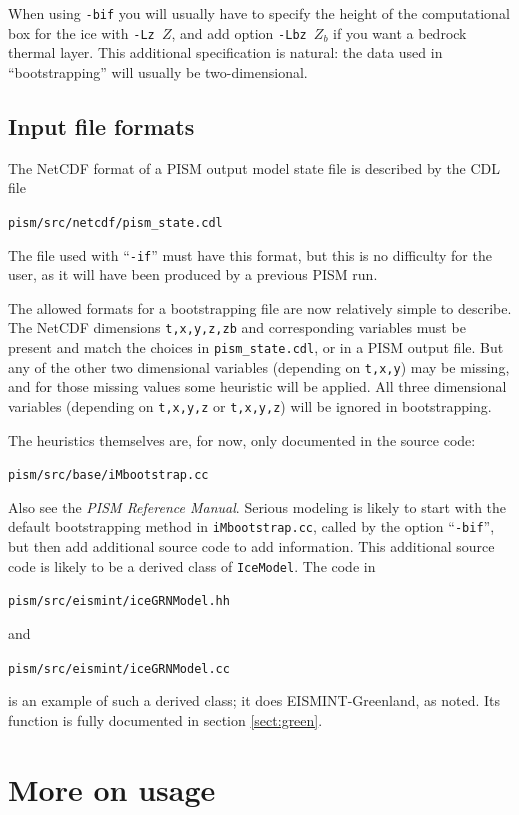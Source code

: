 \documentclass[11pt,final]{amsart}
\begin{document}
When using \verb|-bif| you will usually have to specify the height of the computational box for the ice with \verb|-Lz |$Z$, and add option \verb|-Lbz |$Z_b$ if you want a bedrock thermal layer.  This additional specification is natural: the data used in ``bootstrapping'' will usually be two-dimensional.

\subsection{Input file formats} The NetCDF format of a PISM output model state file is described by the CDL file
\begin{center}\verb|pism/src/netcdf/pism_state.cdl|\end{center}
\noindent The file used with ``\verb|-if|'' must have this format, but this is no difficulty for the user, as it will have been produced by a previous PISM run.

The allowed formats for a bootstrapping file are now relatively simple to describe.  The NetCDF dimensions \verb|t,x,y,z,zb| and corresponding variables must be present and match the choices in \verb|pism_state.cdl|, or in a PISM output file.  But any of the other two dimensional variables (depending on \verb|t,x,y|) may be missing, and for those missing values some heuristic will be applied.  All three dimensional variables (depending on \verb|t,x,y,z| or \verb|t,x,y,z|) will be ignored in bootstrapping.

The heuristics themselves are, for now, only documented in the source code:
\begin{center}\verb|pism/src/base/iMbootstrap.cc|\end{center}
\noindent Also see the \emph{PISM Reference Manual}.  Serious modeling is likely to start with the default bootstrapping method in \verb|iMbootstrap.cc|, called by the option ``\verb|-bif|'', but then add additional source code to add information.  This additional source code is likely to be a derived class of \verb|IceModel|.  The code in 
\begin{center}\verb|pism/src/eismint/iceGRNModel.hh|\end{center}
\noindent and
\begin{center}\verb|pism/src/eismint/iceGRNModel.cc|\end{center}
\noindent is an example of such a derived class; it does EISMINT-Greenland, as noted.  Its function is fully documented in section \ref{sect:green}.


\clearpage
\newpage
\section{More on usage}\label{sect:usage}
\end{document}
